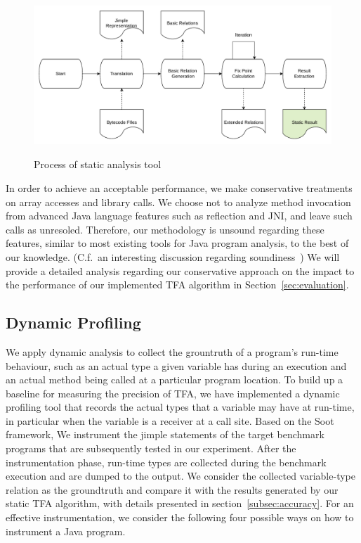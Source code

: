 \documentclass{fac}
\begin{document}
\begin{figure}
\centering
\includegraphics[width=16cm,height=6cm]{static-process.pdf}
\caption{Process of static analysis tool}
\label{fig:static-process}
\end{figure}

In order to achieve an acceptable performance, we make conservative treatments on array accesses and library calls. We choose not to analyze method invocation from advanced Java language features such as reflection and JNI, and leave such calls as unresoled. Therefore, our methodology is unsound regarding these features, similar to most existing tools for Java program analysis, to the best of our knowledge. (C.f.~an interesting discussion regarding soundiness~\cite{LivshitsSSLACGKMV15}) We will provide a detailed analysis regarding our conservative approach on the impact to the performance of our implemented TFA algorithm in Section~\ref{sec:evaluation}.



\subsection{Dynamic Profiling}\label{subsec:dynamic-profiler}

We apply dynamic analysis to collect the grountruth of a program's run-time behaviour, such as an actual type a given variable has during an execution and an actual method being called at a particular program location. To build up a baseline for measuring the precision of TFA, we have implemented a dynamic profiling tool that records the actual types that a variable may have at run-time, in particular when the variable is a receiver at a call site. Based on the Soot framework, We instrument the jimple statements of the target benchmark programs that are subsequently tested in our experiment. After the instrumentation phase, run-time types are collected during the benchmark execution and are dumped to the output. We consider the collected variable-type relation as the groundtruth and compare it with the results generated by our static TFA algorithm, with details presented in section~\ref{subsec:accuracy}. For an effective instrumentation, we consider the following four possible ways on how to instrument a Java program.
\end{document}
